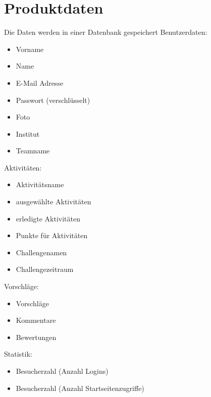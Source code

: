 \section{Produktdaten}
Die Daten werden in einer Datenbank gespeichert 
Benutzerdaten: 
\begin{itemize}
\item Vorname
\item Name
\item E-Mail Adresse
\item Passwort (verschlüsselt)
\item Foto
\item Institut
\item Teamname
\end{itemize}

Aktivitäten: 
\begin{itemize}
\item Aktivitätsname
\item ausgewählte Aktivitäten
\item erledigte Aktivitäten
\item Punkte für Aktivitäten
\item Challengenamen
\item Challengezeitraum
\end{itemize}

Vorschläge:
\begin{itemize}
\item Vorschläge
\item Kommentare
\item Bewertungen
\end{itemize}

Statistik:
\begin{itemize}
\item Besucherzahl (Anzahl Logins)
\item Besucherzahl (Anzahl Startseitenzugriffe)
\end{itemize}





